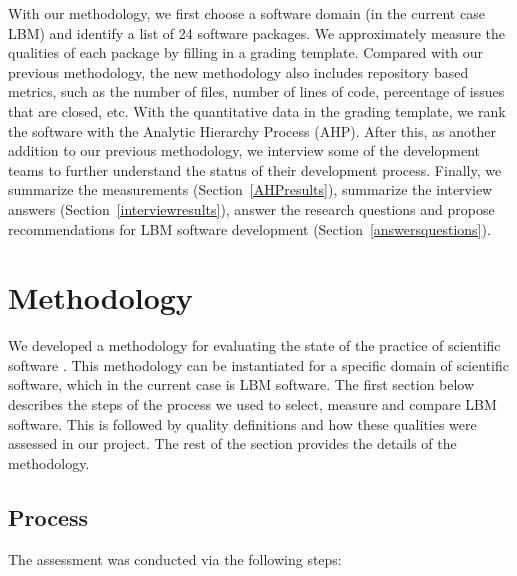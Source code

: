 \documentclass[final, 3p, times, authoryear]{elsarticle}
\begin{document}
With our methodology, we first choose a software domain (in the current case
LBM) and identify a list of 24 software packages.  We approximately measure the
qualities of each package by filling in a grading template. Compared with our
previous methodology, the new methodology also includes repository based
metrics, such as the number of files, number of lines of code, percentage of
issues that are closed, etc.  With the quantitative data in the grading
template, we rank the software with the Analytic Hierarchy Process (AHP). After
this, as another addition to our previous methodology, we interview some of the
development teams to further understand the status of their development process.
Finally, we summarize the measurements (Section~\ref{AHPresults}), summarize the
interview answers (Section~\ref{interviewresults}), answer the research
questions and propose recommendations for LBM software development
(Section~\ref{answersquestions}).

\section{Methodology} \label{methodology}

We developed a methodology for evaluating the state of the practice of
scientific software \citep{SmithEtAl2021}.  This methodology can be instantiated
for a specific domain of scientific software, which in the current case is LBM
software.  The first section below describes the steps of the process we used to
select, measure and compare LBM software. This is followed by quality
definitions and how these qualities were assessed in our project. The rest of
the section provides the details of the methodology.

\subsection{Process}

The assessment was conducted via the following steps: 
\end{document}
